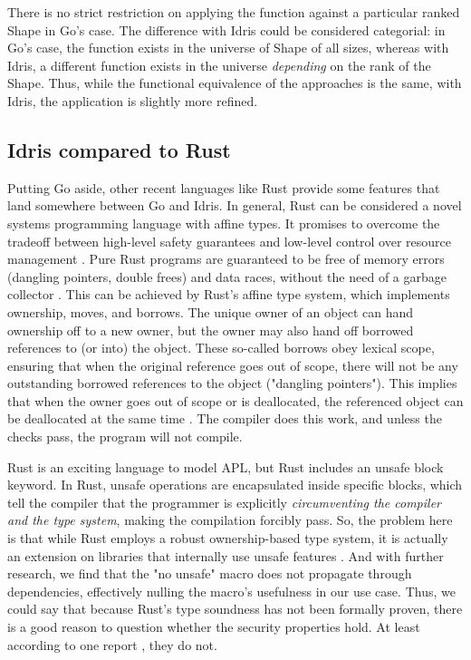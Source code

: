 \documentclass{report}
\begin{document}
There is no strict restriction on applying the function against a particular ranked Shape in Go's case. The difference with Idris could be considered categorial: in Go's case, the function exists in the universe of Shape of all sizes, whereas with Idris, a different function exists in the universe \emph{depending} on the rank of the Shape. Thus, while the functional equivalence of the approaches is the same, with Idris, the application is slightly more refined.

\subsection{Idris compared to Rust}

Putting Go aside, other recent languages like Rust provide some features that land somewhere between Go and Idris. In general, Rust can be considered a novel systems programming language with affine types. It promises to overcome the tradeoff between high-level safety guarantees and low-level control over resource management \cite{jung2017rustbelt}. Pure Rust programs are guaranteed to be free of memory errors (dangling pointers, double frees) and data races, without the need of a garbage collector \cite{matsakis2014rust, wang2018krust}. This can be achieved by Rust's affine type system, which implements ownership, moves, and borrows. The unique owner of an object can hand ownership off to a new owner, but the owner may also hand off borrowed references to (or into) the object. These so-called borrows obey lexical scope, ensuring that when the original reference goes out of scope, there will not be any outstanding borrowed references to the object ("dangling pointers"). This implies that when the owner goes out of scope or is deallocated, the referenced object can be deallocated at the same time \cite{matsakis2014rust}. The compiler does this work, and unless the checks pass, the program will not compile.

Rust is an exciting language to model APL, but Rust includes an unsafe block keyword. In Rust, unsafe operations are encapsulated inside specific blocks, which tell the compiler that the programmer is explicitly \emph{circumventing the compiler and the type system}, making the compilation forcibly pass. So, the problem here is that while Rust employs a robust ownership-based type system, it is actually an extension on libraries that internally use unsafe features \cite{jung2017rustbelt}. And with further research, we find that the "no unsafe" macro does not propagate through dependencies, effectively nulling the macro's usefulness in our use case. Thus, we could say that because Rust's type soundness has not been formally proven, there is a good reason to question whether the security properties hold. At least according to one report \cite{matsakis2014rust}, they do not.
\end{document}
